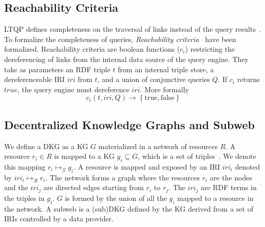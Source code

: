 \subsection{Reachability Criteria}

LTQP defines completeness on the traversal of links instead of the query results~\cite{Hartig2012}.
To formalize the completeness of queries, \emph{Reachability criteria}~\cite{Hartig2012} have been formalized.
Reachability criteria are boolean functions ($c_i$) restricting the dereferencing of links from the internal data source of the query engine.
They take as parameters an RDF triple $t$ from an internal triple store, a dereferenceable IRI $iri$ from $t$, and a union of conjunctive queries $Q$.
If $c_i$ returns $true$, the query engine must dereference $iri$.
More formally
\begin{equation}\label{eq:reachabilityCriteria}
c_i(t, iri, Q) \rightarrow \left\{ \mathrm{true}, \mathrm{false} \right\}
\end{equation}

\subsection{Decentralized Knowledge Graphs and Subweb}\label{sec:dkg}

We define a DKG as a KG $G$ materialized in a network of resources $R$.
A resource $r_i \in R$ is mapped to a KG $g_i \subseteq G$, which is a set of triples~\cite{w3ConceptsAbstract}.
We denote this mapping $r_i \mapsto_{\mathcal{G}} g_i$.
A resource is mapped and exposed by an IRI $iri_i$ denoted by $iri_i \mapsto_{\mathcal{R}} r_i$.
The network forms a graph where the resources $r_i$ are the nodes and the $iri_j$ are directed edges starting from $r_i$ to $r_j$.
The $iri_j$ are RDF terms in the triples in $g_i$.
$G$ is formed by the union of all the $g_i$ mapped to a resource in the network.
A subweb is a (sub)DKG defined by the KG derived from a set of IRIs controlled by a data provider.

